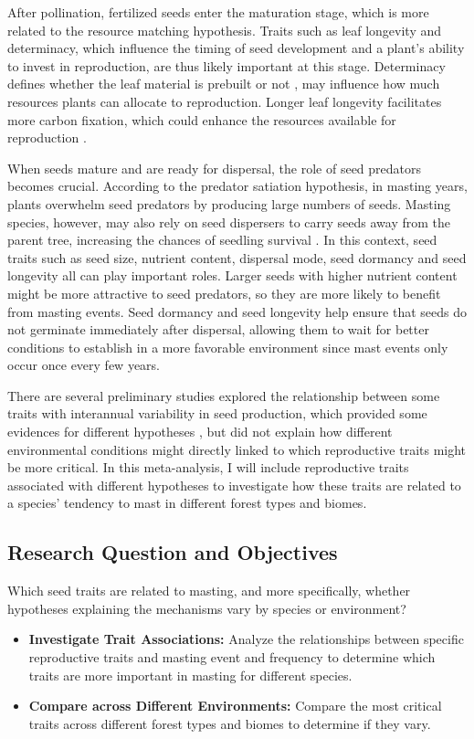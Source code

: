 \documentclass[11pt,letter]{article}
\begin{document}
After pollination, fertilized seeds enter the maturation stage, which is more related to the resource matching hypothesis. Traits such as leaf longevity and determinacy, which influence the timing of seed development and a plant's ability to invest in reproduction, are thus likely important at this stage. Determinacy defines whether the leaf material is prebuilt or not \citep{lechowicz1984temperate}, may influence how much resources plants can allocate to reproduction.  Longer leaf longevity facilitates more carbon fixation, which could enhance the resources available for reproduction \citep{adler2014functional}. \par
When seeds mature and are ready for dispersal, the role of seed predators becomes crucial. According to the predator satiation hypothesis, in masting years, plants overwhelm seed predators by producing large numbers of seeds. Masting species, however, may also rely on seed dispersers to carry seeds away from the parent tree, increasing the chances of seedling survival \citep{janzen1971seed, silvertown1980evolutionary}. In this context, seed traits such as seed size, nutrient content, dispersal mode, seed dormancy and seed longevity all can play important roles. Larger seeds with higher nutrient content might be more attractive to seed predators, so they are more likely to benefit from masting events. Seed dormancy and seed longevity help ensure that seeds do not germinate immediately after dispersal, allowing them to wait for better conditions to establish in a more favorable environment since mast events only occur once every few years.\par
There are several preliminary studies explored the relationship between some traits with interannual variability in seed production, which provided some evidences for different hypotheses \citep{journe2023evolution, fernandez2019nutrient, pearse2020biogeography}, but did not explain how different environmental conditions might directly linked to which reproductive traits might be more critical. In this meta-analysis, I will include reproductive traits associated with different hypotheses to investigate how these traits are related to a species' tendency to mast in different forest types and biomes.\par
\subsection{Research Question and Objectives}
Which seed traits are related to masting, and more specifically, whether hypotheses explaining the mechanisms vary by species or environment?
	\begin{itemize}
	\item \textbf{Investigate Trait Associations:} Analyze the relationships between specific reproductive traits and masting event and frequency to determine which traits are more important in masting for different species.
	\item \textbf{Compare across Different Environments:} Compare the most critical traits across different forest types and biomes to determine if they vary.
	\end{itemize}
\end{document}
